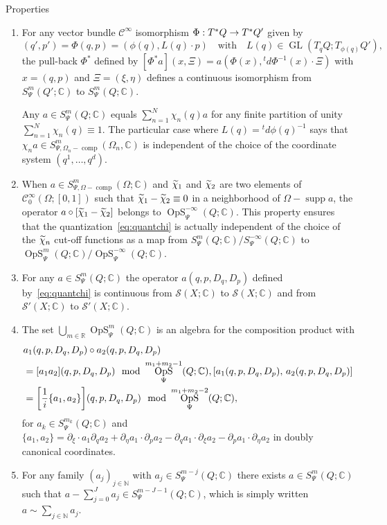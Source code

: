 \documentclass[AHL,Unicode,longabstracts]{cedram}
\newcommand{\C}{\mathbb{C}}
\newcommand{\R}{\mathbb{R}}
\newcommand{\N}{\mathbb{N}}
\newcommand{\clC}{\mathcal{C}}
\newcommand{\clS}{\mathcal{S}}
\DeclareMathOperator{\OpS}{OpS}
\DeclareMathOperator{\ccomp}{comp}
\DeclareMathOperator{\suppp}{supp}
\DeclareMathOperator{\GL}{GL}
\newcommand*{\relabel}{\renewcommand{\labelenumi}{(\theenumi)}}
\newcommand*{\alphenumi}{\renewcommand*{\theenumi}{\alph{enumi}}\relabel}
\let\oldtilde\tilde
\renewcommand*{\tilde}[1]{\mathchoice{\widetilde{#1}}{\widetilde{#1}}{\oldtilde{#1}}{\oldtilde{#1}}}
\let\originalleft\left
\let\originalright\right
\renewcommand{\left}{\mathopen{}\mathclose\bgroup\originalleft}
\renewcommand{\right}{\aftergroup\egroup\originalright}
\renewcommand*{\to}{\mathchoice{\longrightarrow}{\rightarrow}{\rightarrow}{\rightarrow}}
\begin{document}
\begin{enonce*}[remark]{Properties}\leavevmode
\begin{enumerate}\alphenumi
\item\label{propa} For any vector bundle $\clC^{\infty}$ isomorphism $\Phi: T^{*}Q\to T^{*}Q'$ given by
\[
(q',p')=\Phi(q,p)=(\phi(q), L(q)\cdot p)\quad\text{with}\quad L(q)\in \GL (T_{q}Q;T_{\phi(q)}Q'),
\]
the pull-back $\Phi^{*}$ defined by $[\Phi^{*}a](x,\Xi)=a(\Phi(x),{}^{t}d\Phi^{-1}(x)\cdot\Xi)$ with $x=(q,p)$ and $\Xi=(\xi,\eta)$ defines a continuous isomorphism from $S^{m}_{\Psi}(Q';\C)$ to $S^{m}_{\Psi}(Q;\C)$.

Any $a\in S^{m}_{\Psi}(Q;\C)$ equals $\sum_{n=1}^{N}\chi_{n}(q)a$ for any finite partition of unity $\sum_{n=1}^{N}\chi_{n}(q)\equiv 1$. The particular case where $L(q)={}^{t}d\phi(q)^{-1}$ says that $\chi_{n}a\in S^{m}_{\Psi, \Omega_{n}-\ccomp}(\Omega_{n},\C)$ is independent of the choice of the coordinate system $(q^{1},\dots,q^{d})$.

\item\label{propb} When $a\in S^{m}_{\Psi, \Omega-\ccomp}(\Omega;\C)$ and $\tilde{\chi}_{1}$ and $\tilde{\chi}_{2}$ are two elements of $\clC^{\infty}_{0}(\Omega;[0,1])$ such that $\tilde{\chi}_{1}-\tilde{\chi}_{2}\equiv 0$ in a neighborhood of $\Omega-\suppp a$, the operator $a\circ[\tilde{\chi}_{1}-\tilde{\chi}_{2}]$ belongs to $\OpS^{-\infty}_{\Psi}(Q;\C)$. This property ensures that the quantization~\eqref{eq:quantchi} is actually independent of the choice of the $\tilde{\chi}_{n}$ cut-off functions as a map from $S^{m}_{\Psi}(Q;\C)/S^{-\infty}_{\Psi}(Q;\C)$ to $\OpS^{m}_{\Psi}(Q;\C)/\OpS^{-\infty}_{\Psi}(Q;\C)$.
\item\label{propc} For any $a\in S^{m}_{\Psi}(Q;\C)$ the operator $a(q,p,D_{q},D_{p})$ defined by~\eqref{eq:quantchi} is continuous from $\clS(X;\C)$ to $\clS(X;\C)$ and from $\clS'(X;\C)$ to $\clS'(X;\C)$.
\item\label{propd} The set $\bigcup_{m\in \R}\OpS^{m}_{\Psi}(Q;\C)$ is an algebra for the composition product with
\begin{align*}
&a_{1}(q,p,D_{q},D_{p})\circ a_{2}(q,p,D_{q},D_{p})\\
&=[a_{1}a_{2}](q,p,D_{q},D_{p}) \mod \OpS^{m_{1}+m_{2}-1}_{\Psi}(Q;\C),
\left[a_{1}(q,p,D_{q},D_{p}),\, a_{2}(q,p,D_{q},D_{p})\right]
\\
&=\left[\frac{1}{i}\{a_{1},a_{2}\}\right](q,p,D_{q},D_{p})
\mod \OpS^{m_{1}+m_{2}-2}_{\Psi}(Q;\C),
\end{align*}
for $a_{k}\in S^{m_{k}}_{\Psi}(Q;\C)$ and $\{a_{1},a_{2}\}=\partial_{\xi}\cdot a_{1}\partial_{q}a_{2}+\partial_{\eta}a_{1}\cdot\partial_{p}a_{2}-\partial_{q}a_{1}\cdot\partial_{\xi}a_{2}-\partial_{p}a_{1}\cdot\partial_{\eta}a_{2}$ in doubly canonical coordinates.
\item\label{prope} For any family $(a_{j})_{j\in \N}$ with $a_{j}\in S^{m-j}_{\Psi}(Q;\C)$ there exists $a\in S^{m}_{\Psi}(Q;\C)$ such that $a-\sum_{j=0}^{J}a_{j}\in S^{m-J-1}_{\Psi}(Q;\C)$, which is simply written $a\sim \sum_{j\in \N}a_{j}$.


\end{enumerate}
\end{enonce*}
\end{document}
